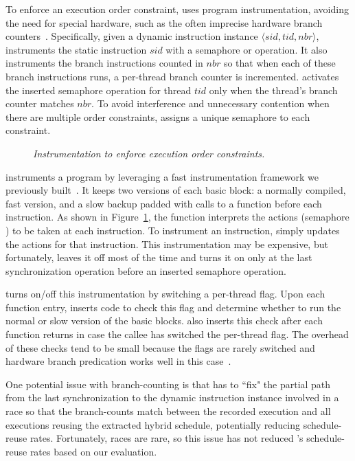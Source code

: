 To enforce an execution order constraint, \peregrine uses program
instrumentation, avoiding the need for special hardware, such as the often
imprecise hardware branch counters~\cite{smp-revirt:vee08}.
Specifically, given a dynamic instruction instance $\langle sid, tid, nbr \rangle$, \peregrine
instruments the static instruction $sid$ with a semaphore  or
 operation. 
It also instruments the branch instructions counted in $nbr$ so that when
each of these branch instructions runs, a per-thread branch counter is
incremented.  \peregrine activates the inserted semaphore operation for thread
$tid$ only when the thread's branch counter matches $nbr$.  To avoid
interference and unnecessary contention when there are multiple order
constraints, \peregrine assigns a unique semaphore to each constraint.


\begin{figure}[t]
\hspace{1.5in}
\begin{minipage}{0.45\textwidth}
\tiny {}
\end{minipage}
\vspace{-.1in}
\caption{\emph{Instrumentation to enforce execution order
    constraints.}} \label{fig:peregrine-slot}
\vspace{-.1in}
\end{figure}

\peregrine instruments a program by leveraging a fast instrumentation framework we
previously built~\cite{wu:loom:osdi10}.  It keeps two versions of each
basic block: a normally compiled, fast version, and a slow backup
padded with calls to a  function before each instruction.  As
shown in Figure~\ref{fig:peregrine-slot}, the  function interprets the
actions (semaphore ) to be taken at each instruction.  To
instrument an instruction, \peregrine simply updates the actions for that 
instruction.  This instrumentation may be expensive, but fortunately, \peregrine
leaves it off most of the time and turns it on only at the last
synchronization operation before an inserted semaphore operation.

\peregrine turns on/off this instrumentation by switching a per-thread flag.
Upon each function entry, \peregrine inserts code to check this flag and
determine whether to run the normal or slow version of the basic blocks.
\peregrine also inserts this check after each function returns in case the
callee has switched the per-thread flag.  The overhead of these checks
tend to be small because the flags are rarely switched 
and hardware branch predication works well in this case~\cite{wu:loom:osdi10}.

One potential issue with branch-counting is that \peregrine has to
``fix" the partial path from the last synchronization to the dynamic
instruction instance involved in a race so that the branch-counts match
between the recorded execution and all executions
reusing the extracted hybrid schedule, potentially reducing schedule-reuse rates.
Fortunately, races are rare, so this issue has not reduced \peregrine's
schedule-reuse rates based on our evaluation.

